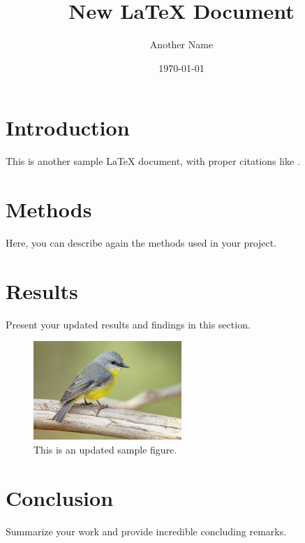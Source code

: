 \documentclass{article}
\begin{document}
\title{New LaTeX Document}
\author{Another Name}
\date{\today}

\maketitle

\section{Introduction}
This is another sample LaTeX document, with proper citations like \cite{smith2021,jones2020,brown2019}.

\section{Methods}
Here, you can describe again the methods used in your project.

\section{Results}
Present your updated results and findings in this section.

\begin{figure}[h]
    \centering
    \includegraphics[width=0.5\textwidth]{image.jpeg}
    \caption{This is an updated sample figure.}
    \label{fig:sample}
\end{figure}

\section{Conclusion}
Summarize your work and provide incredible concluding remarks.



\end{document}
